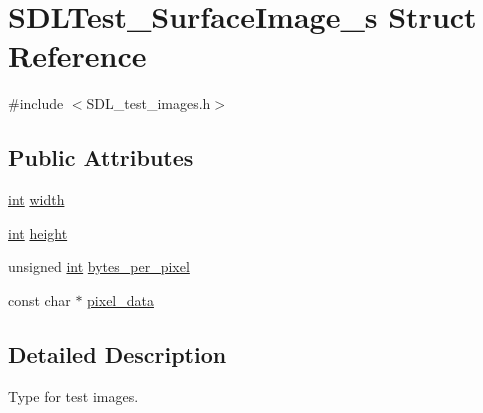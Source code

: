 \hypertarget{struct_s_d_l_test___surface_image__s}{\section{S\-D\-L\-Test\-\_\-\-Surface\-Image\-\_\-s Struct Reference}
\label{struct_s_d_l_test___surface_image__s}
}


{\ttfamily \#include $<$S\-D\-L\-\_\-test\-\_\-images.\-h$>$}

\subsection*{Public Attributes}
\begin{DoxyCompactItemize}
\item 
\hyperlink{_s_d_l__thread_8h_a6a64f9be4433e4de6e2f2f548cf3c08e}{int} \hyperlink{struct_s_d_l_test___surface_image__s_a3cbacf6b015a22832ab4d3f509719609}{width}
\item 
\hyperlink{_s_d_l__thread_8h_a6a64f9be4433e4de6e2f2f548cf3c08e}{int} \hyperlink{struct_s_d_l_test___surface_image__s_a310092874695556e4b7f1f63aec24213}{height}
\item 
unsigned \hyperlink{_s_d_l__thread_8h_a6a64f9be4433e4de6e2f2f548cf3c08e}{int} \hyperlink{struct_s_d_l_test___surface_image__s_a2daf91bab3d79fb9dfa25e8ade43e606}{bytes\-\_\-per\-\_\-pixel}
\item 
const char $\ast$ \hyperlink{struct_s_d_l_test___surface_image__s_acf2d3006bea5690f564d3003d1512fa7}{pixel\-\_\-data}
\end{DoxyCompactItemize}


\subsection{Detailed Description}
Type for test images. 


